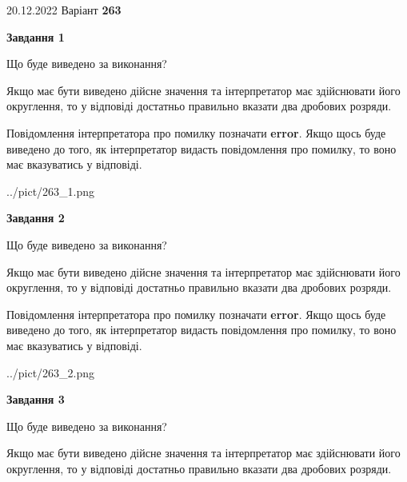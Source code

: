 \documentclass[12pt, ukrainian]{article}
\begin{document}
{20.12.2022 Варіант \No \textbf { 263 }\par}
{
\begin {Large}

{\begin {center}\textbf{Завдання 1}\end {center}}\par
Що буде виведено за виконання? \par

Якщо має бути виведено дійсне значення та інтерпретатор має здійснювати його округлення, 
то у відповіді достатньо правильно вказати два дробових розряди.

Повідомлення інтерпретатора про помилку позначати \textbf{error}.
Якщо щось буде виведено до того, як інтерпретатор видасть повідомлення про помилку, 
то воно має вказуватись у відповіді. \par

\begin{center}
	{../pict/263_1.png}
\end{center}
\newpage

{\begin {center}\textbf{Завдання 2}\end {center}}\par
Що буде виведено за виконання? \par

Якщо має бути виведено дійсне значення та інтерпретатор має здійснювати його округлення, 
то у відповіді достатньо правильно вказати два дробових розряди.

Повідомлення інтерпретатора про помилку позначати \textbf{error}.
Якщо щось буде виведено до того, як інтерпретатор видасть повідомлення про помилку, 
то воно має вказуватись у відповіді. \par

\begin{center}
	{../pict/263_2.png}
\end{center}
\newpage

{\begin {center}\textbf{Завдання 3}\end {center}}\par
Що буде виведено за виконання? \par

Якщо має бути виведено дійсне значення та інтерпретатор має здійснювати його округлення, 
то у відповіді достатньо правильно вказати два дробових розряди.


\end{Large}}
\end{document}
